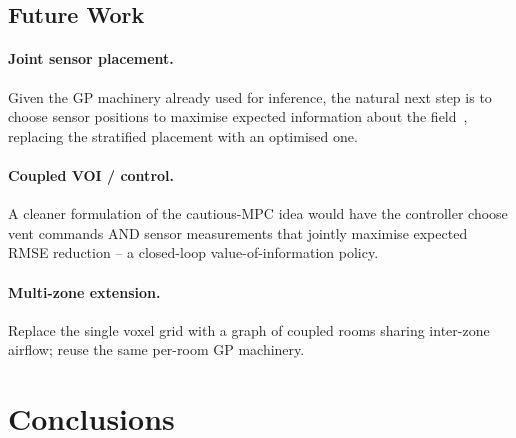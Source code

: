 \documentclass[11pt,letterpaper]{article}
\begin{document}
\subsection{Future Work}

\paragraph{Joint sensor placement.}
Given the GP machinery already used for inference, the natural next step
is to choose sensor positions to maximise expected information about the
field~\citep{krause2008}, replacing the stratified placement with an
optimised one.

\paragraph{Coupled VOI / control.}
A cleaner formulation of the cautious-MPC idea would have the controller
choose vent commands AND sensor measurements that jointly maximise expected
RMSE reduction -- a closed-loop value-of-information policy.

\paragraph{Multi-zone extension.}
Replace the single voxel grid with a graph of coupled rooms sharing
inter-zone airflow; reuse the same per-room GP machinery.

\section{Conclusions}
\end{document}
